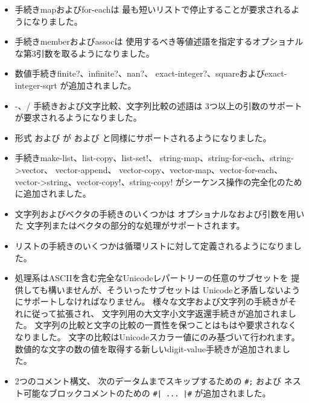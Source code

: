 \begin{itemize}
\item 手続き{\cf map}および{\cf for-each}は
最も短いリストで停止することが要求されるようになりました。

\item 手続き{\cf member}および{\cf assoc}は
使用するべき等値述語を指定するオプショナルな第3引数を取るようになりました。

\item 数値手続き{\cf finite?}、{\cf infinite?}、{\cf nan?}、
{\cf exact-\+integer?}、{\cf square}および{\cf exact-\+integer-\+sqrt}
が追加されました。

\item {\cf -}、{\cf /} 手続きおよび文字比較、文字列比較の述語は
3つ以上の引数のサポートが要求されるようになりました。

\item 形式 \sharptrue{}および \sharpfalse{}が %
\schtrue{}および \schfalse{}と同様にサポートされるようになりました。

\item 手続き{\cf make-\+list}、{\cf list-\+copy}、{\cf list-\+set!}、
{\cf string-\+map}、{\cf string-\+for-\+each}、{\cf string->\+vector}、
{\cf vector-\+append}、
{\cf vector-\+copy}、{\cf vector-\+map}、{\cf vector-\+for-\+each}、
{\cf vector->\+string}、{\cf vector-\+copy!}、{\cf string-\+copy!}
がシーケンス操作の完全化のために追加されました。

\item 文字列およびベクタの手続きのいくつかは
オプショナルなおよび引数を用いた
文字列またはベクタの部分的な処理がサポートされます。

\item リストの手続きのいくつかは循環リストに対して定義されるようになりました。

\item 処理系はASCIIを含む完全なUnicodeレパートリーの任意のサブセットを
提供しても構いませんが、そういったサブセットは
Unicodeと矛盾しないようにサポートしなければなりません。
様々な文字および文字列の手続きがそれに従って拡張され、
文字列用の大文字小文字返還手続きが追加されました。
文字列の比較と文字の比較の一貫性を保つことはもはや要求されなくなりました。
文字の比較はUnicodeスカラー値にのみ基づいて行われます。
数値的な文字の数の値を取得する新しい{\cf digit-value}手続きが追加されました。

\item 2つのコメント構文、
次のデータムまでスキップするための {\tt \#;} および
ネスト可能なブロックコメントのための {\tt \#| ... |\#}
が追加されました。


\end{itemize}
